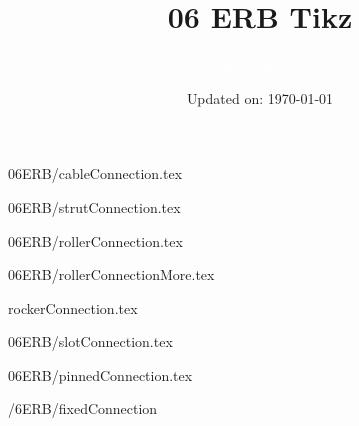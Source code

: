 \documentclass[9pt, xcolor={svgnames, x11names},professionalfonts]{beamer}
\title[06ERB Tikz]{\Huge 06 ERB Tikz}
\subtitle[Engineering Statics]{\Large\textcolor{white}{Engineering Statics}}
\author{}
\date{\small Updated on: \today}
\def\scale{1}
\begin{document}

\begin{frame}[plain]    %
	\titlepage
\end{frame}



\begin{frame}{06ERB/cableConnection.tex}
	\def\scale{0.5}
	
\end{frame}

\begin{frame}{06ERB/strutConnection.tex}
	\def\scale{0.5}
	
\end{frame}

\begin{frame}{06ERB/rollerConnection.tex}
	\def\scale{0.45}
	
\end{frame}

\begin{frame}{06ERB/rollerConnectionMore.tex}
	\def\scale{0.35}	
	
\end{frame}

\begin{frame}{rockerConnection.tex}
	\def\scale{0.35}
	
\end{frame}

\begin{frame}{06ERB/slotConnection.tex}
	\def\scale{0.45}
		
\end{frame}

\begin{frame}{06ERB/pinnedConnection.tex}
	\def\scale{0.45}
		
\end{frame}

\begin{frame}{/6ERB/fixedConnection}
	\def\scale{0.45}
		
\end{frame}
\end{document}
